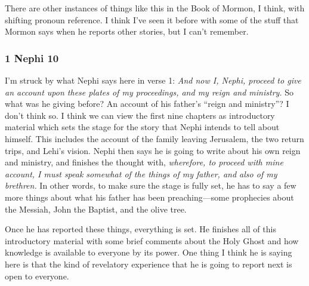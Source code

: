 \begin{compactdesc}
\begin{compactdesc}
		There are other instances of things like this in the Book of Mormon, I think, with shifting pronoun reference. I think I've seen it before with some of the stuff that Mormon says when he reports other stories, but I can't remember.
		\end{compactdesc}

		\end{compactdesc}

	\subsubsection{1 Nephi 10} %

		I'm struck by what Nephi says here in verse 1: \textit{And now I, Nephi, proceed to give an account upon these plates of my proceedings, and my reign and ministry.} So what was he giving before? An account of his father's ``reign and ministry''? I don't think so. I think we can view the first nine chapters as introductory material which sets the stage for the story that Nephi intends to tell about himself. This includes the account of the family leaving Jerusalem, the two return trips, and Lehi's vision. Nephi then says he is going to write about his own reign and ministry, and finishes the thought with, \textit{wherefore, to proceed with mine account, I must speak somewhat of the things of my father, and also of my brethren.} In other words, to make sure the stage is fully set, he has to say a few more things about what his father has been preaching---some prophecies about the Messiah, John the Baptist, and the olive tree.

		Once he has reported these things, everything is set. He finishes all of this introductory material with some brief comments about the Holy Ghost and how knowledge is available to everyone by its power. One thing I think he is saying here is that the kind of revelatory experience that he is going to report next is open to everyone.

